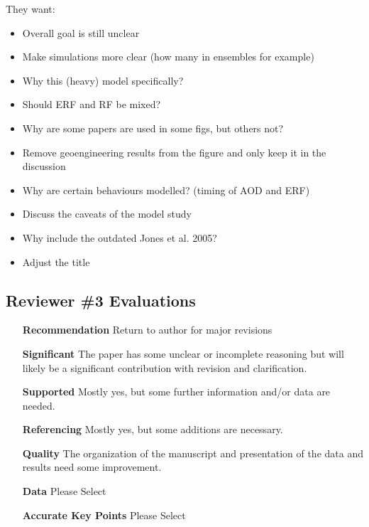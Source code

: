 \documentclass{reviewresponse}
\newenvironment{evaluation}{%
  \begin{tcolorbox}[attach title to upper, title={Evaluations}, after title={.\enskip},
    fonttitle={\bfseries}, coltitle={colorevalfg}, colback={colorevalbg},
    colframe={colorevalframe},]
  }{
  \end{tcolorbox}
}
\begin{document}
  \reviewer[3]

  They want:
  \begin{itemize}
    \item
    Overall goal is still unclear
    \item
    Make simulations more clear (how many in ensembles for example)
    \item
    Why this (heavy) model specifically?
    \item
    Should ERF and RF be mixed?
    \item
    Why are some papers are used in some figs, but others not?
    \item
    Remove geoengineering results from the figure and only keep it in the discussion
    \item
    Why are certain behaviours modelled? (timing of AOD and ERF)
    \item
    Discuss the caveats of the model study
    \item
    Why include the outdated Jones et al. 2005?
    \item
    Adjust the title
  \end{itemize}

  \subsection*{Reviewer \#3 Evaluations}

  \begin{evaluation}
    \begin{itemize}[leftmargin=4.5cm,noitemsep]
      \item
      [\textbf{Recommendation}] Return to author for major revisions
      \item
      [\textbf{Significant}] The paper has some unclear or incomplete reasoning but will
      likely be a significant contribution with revision and clarification.
      \item
      [\textbf{Supported}] Mostly yes, but some further information and/or data are
      needed.
      \item
      [\textbf{Referencing}] Mostly yes, but some additions are necessary.
      \item
      [\textbf{Quality}] The organization of the manuscript and presentation of the data
      and results need some improvement.
      \item
      [\textbf{Data}] Please Select
      \item
      [\textbf{Accurate Key Points}] Please Select
    \end{itemize}
  \end{evaluation}
\end{document}
